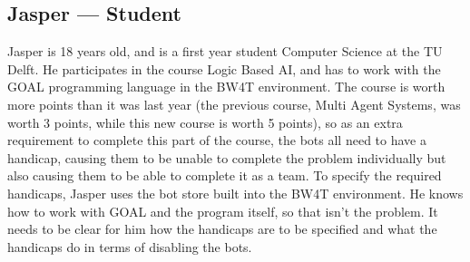 \subsection{Jasper --- Student}
Jasper is 18 years old, and is a first year student Computer Science at the TU Delft. He participates in the course Logic Based AI, and has to work with the GOAL programming language in the BW4T environment. The course is worth more points than it was last year (the previous course, Multi Agent Systems, was worth 3 points, while this new course is worth 5 points), so as an extra requirement to complete this part of the course, the bots all need to have a handicap, causing them to be unable to complete the problem individually but also causing them to be able to complete it as a team. To specify the required handicaps, Jasper uses the bot store built into the BW4T environment. 
He knows how to work with GOAL and the program itself, so that isn’t the problem. It needs to be clear for him how the handicaps are to be specified and what the handicaps do in terms of disabling the bots.
 